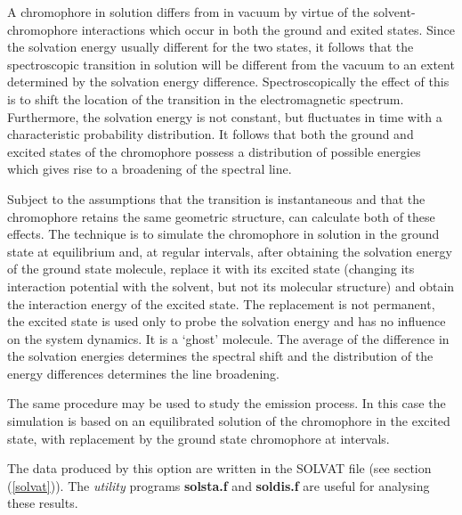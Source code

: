 A chromophore in solution differs from in vacuum by virtue of the
solvent-chromophore interactions which occur in both the ground and exited
states. Since the solvation energy usually different for the two states, it
follows that the spectroscopic transition in solution will be different from
the vacuum to an extent determined by the solvation energy difference.
Spectroscopically the effect of this is to shift the location of the
transition in the electromagnetic spectrum. Furthermore, the solvation energy
is not constant, but fluctuates in time with a characteristic probability
distribution. It follows that both the ground and excited states of the
chromophore possess a distribution of possible energies which gives rise to a
broadening of the spectral line.

Subject to the assumptions that the transition is instantaneous and that the
chromophore retains the same geometric structure, \D{} can calculate both of
these effects. The technique is to simulate the chromophore in solution in the
ground state at equilibrium and, at regular intervals, after obtaining the
solvation energy of the ground state molecule, replace it with its excited
state (changing its interaction potential with the solvent, but not its
molecular structure) and obtain the interaction energy of the excited state.
The replacement is not permanent, the excited state is used only to probe the
solvation energy and has no influence on the system dynamics. It is a `ghost'
molecule.  The average of the difference in the solvation energies determines
the spectral shift and the distribution of the energy differences determines
the line broadening.

The same procedure may be used to study the emission process. In this case the
simulation is based on an equilibrated solution of the chromophore in the
excited state, with replacement by the ground state chromophore at intervals.

The data produced by this option are written in the SOLVAT file (see section
(\ref{solvat})). The {\em utility} programs {\bf solsta.f} and {\bf soldis.f}
are useful for analysing these results.
